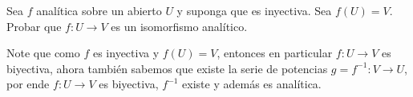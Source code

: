 \begin{homeworkProblem}
  Sea $f$ analítica sobre un abierto $U$ y suponga que es inyectiva. Sea $f(U)=V$. Probar que $f: U\to V$ es un isomorfismo analítico.
  \begin{solution}
    Note que como $f$ es inyectiva y $f(U)=V$, entonces en particular $f:U\to V$ es biyectiva, ahora también sabemos que existe la serie de potencias $g=f^{-1}: V\to U$, por ende $f:U\to V$ es biyectiva, $f^{-1}$ existe y además es analítica.
    \demostrado
  \end{solution}
\end{homeworkProblem}

